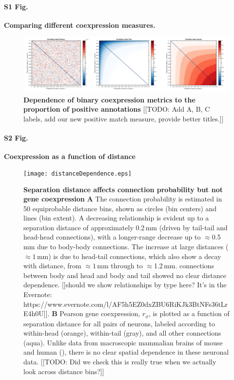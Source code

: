 \documentclass[10pt,letterpaper]{article}
\begin{document}
\paragraph*{S1 Fig.}
{\bf Comparing different coexpression measures.}
\begin{figure}[h]
\label{fig:S_propOnes}
\centering
    \includegraphics[width=1\textwidth]{CoexpressionMeasures.pdf}
\caption{
\textbf{Dependence of binary coexpression metrics to the proportion of positive annotations}
[[TODO: Add A, B, C labels, add our new positive match measure, provide better titles.]]
}
\end{figure}


\paragraph*{S2 Fig.}
{\bf Coexpression as a function of distance}

\begin{figure}[h]
\centering
    \texttt{[image: distanceDependence.eps]}
\caption{
\label{fig:S_distDep}
\textbf{Separation distance affects connection probability but not gene coexpression}
\textbf{A}
The connection probability is estimated in 50 equiprobable distance bins, shown as circles (bin centers) and lines (bin extent).
A decreasing relationship is evident up to a separation distance of approximately 0.2\,mm (driven by tail-tail and head-head connections), with a longer-range decrease up to $\approx$0.5\,mm due to body-body connections.
The increase at large distances ($\approx 1$\,mm) is due to head-tail connections, which also show a decay with distance, from $\approx 1$\,mm through to $\approx$1.2\,mm.
connections between body and head and body and tail showed no clear distance dependence.
[[should we show relationships by type here? It's in the Evernote: https://www.evernote.com/l/AF5h5EZ0dxZBU6RiKJk3BtNFs36tLrE4h0U]].
\textbf{B}
Pearson gene coexpression, $r_\phi$, is plotted as a function of separation distance for all pairs of neurons, labeled according to within-head (orange), within-tail (gray), and all other connections (aqua).
Unlike data from macroscopic mammalian brains of mouse \cite{Fulcher:2016ck} and human (\cite{Krienen:2016eq}), there is no clear spatial dependence in these neuronal data.
[[TODO: Did we check this is really true when we actually look across distance bins?]]
}
\end{figure}
\end{document}

